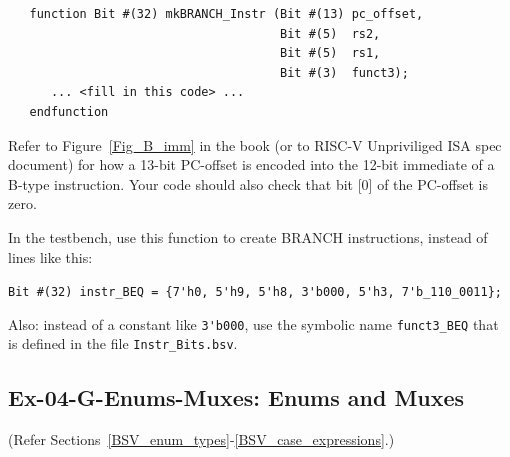 \begin{enumerate}
    \begin{verbatim}
   function Bit #(32) mkBRANCH_Instr (Bit #(13) pc_offset,
                                      Bit #(5)  rs2,
                                      Bit #(5)  rs1,
                                      Bit #(3)  funct3);
      ... <fill in this code> ...
   endfunction
    \end{verbatim}

    Refer to Figure~\ref{Fig_B_imm} in the book (or to RISC-V
    Unpriviliged ISA spec document) for how a 13-bit PC-offset is
    encoded into the 12-bit immediate of a B-type instruction.  Your
    code should also check that bit [0] of the PC-offset is zero.

    In the testbench, use this function to create BRANCH instructions,
    instead of lines like this:

    \hmm \verb|Bit #(32) instr_BEQ = {7'h0, 5'h9, 5'h8, 3'b000, 5'h3, 7'b_110_0011};|

    Also: instead of a constant like \verb|3'b000|, use the symbolic
    name \verb|funct3_BEQ| that is defined in the file \verb|Instr_Bits.bsv|.

\end{enumerate}


\subsection*{Ex-04-G-Enums-Muxes: Enums and Muxes}
\label{Ex-04-G-Enums-Muxes}

(Refer Sections~\ref{BSV_enum_types}-\ref{BSV_case_expressions}.)

